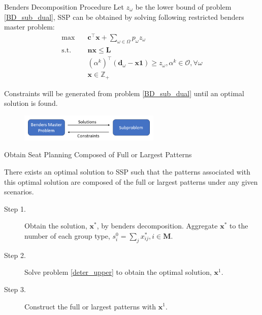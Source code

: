 \begin{frame}{Benders Decomposition Procedure}
  \small
  Let $z_{\omega}$ be the lower bound of problem \eqref{BD_sub_dual}, SSP can be obtained by solving following restricted benders master problem:
  \begin{equation}\label{BD_master2}
    \begin{aligned}
      \max \quad & \mathbf{c}^{\intercal} \mathbf{x} + \sum_{\omega \in \Omega} p_{\omega} z_{\omega} \\
      \text {s.t.} \quad & \mathbf{n} \mathbf{x} \leq \mathbf{L} \\
      & (\alpha^{k})^{\intercal}(\mathbf{d}_{\omega}- \mathbf{x} \mathbf{1}) \geq z_{\omega}, \alpha^k \in \mathcal{O}, \forall \omega \\
       & \mathbf{x} \in \mathbb{Z}_{+}
    \end{aligned}
\end{equation} 

  Constraints will be generated from problem \eqref{BD_sub_dual} until an optimal solution is found.

  \begin{figure}[ht]
    \centering
    \includegraphics[width = 0.6\textwidth]{./images/BD.png}
  \end{figure}
\end{frame}

\begin{frame}{Obtain Seat Planning Composed of Full or Largest Patterns}

  There exists an optimal solution to SSP such that the patterns associated with this optimal solution are composed of the full or largest patterns under any given scenarios.

  \begin{description}
    \item[Step 1.] Obtain the solution, $\mathbf{x}^{*}$, by benders decomposition. Aggregate $\mathbf{x}^{*}$ to the number of each group type, ${s}_{i}^{0} =\sum_{j} x^{*}_{ij}, i \in \mathbf{M}$.

    \item[Step 2.] Solve problem \eqref{deter_upper} to obtain the optimal solution, $\mathbf{x}^{1}$. 
     
    \item[Step 3.] Construct the full or largest patterns with $\mathbf{x}^{1}$.
 \end{description}
\end{frame}

